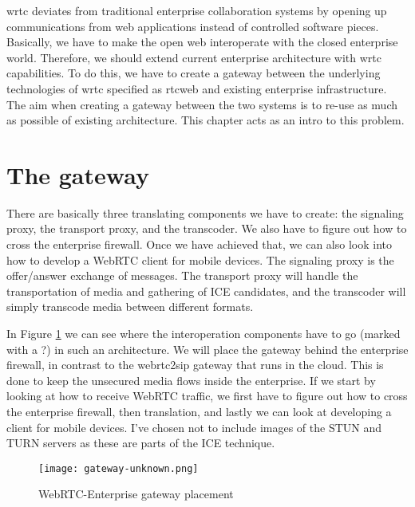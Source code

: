 \gls{wrtc} deviates from traditional enterprise collaboration systems by opening up communications from web applications instead of controlled software pieces. Basically, we have to make the open web interoperate with the closed enterprise world. Therefore, we should extend current enterprise architecture with \gls{wrtc} capabilities. To do this, we have to create a gateway between the underlying technologies of \gls{wrtc} specified as \gls{rtcweb} and existing enterprise infrastructure. The aim when creating a gateway between the two systems is to re-use as much as possible of existing architecture. This chapter acts as an intro to this problem.

\section{The gateway}
There are basically three translating components we have to create: the signaling proxy, the transport proxy, and the transcoder. We also have to figure out how to cross the enterprise firewall. Once we have achieved that, we can also look into how to develop a WebRTC client for mobile devices. The signaling proxy is the offer/answer exchange of messages. The transport proxy will handle the transportation of media and gathering of ICE candidates, and the transcoder will simply transcode media between different formats.

In Figure \ref{fig:gateway-layers} we can see where the interoperation components have to go (marked with a ?) in such an architecture. We will place the gateway behind the enterprise firewall, in contrast to the webrtc2sip gateway that runs in the cloud. This is done to keep the unsecured media flows inside the enterprise. If we start by looking at how to receive WebRTC traffic, we first have to figure out how to cross the enterprise firewall, then translation, and lastly we can look at developing a client for mobile devices. I've chosen not to include images of the STUN and TURN servers as these are parts of the ICE technique.
\\
\begin{figure}[here]
\centerline{\texttt{[image: gateway-unknown.png]}}
\caption{WebRTC-Enterprise gateway placement}
\label{fig:gateway-layers}
\end{figure}

